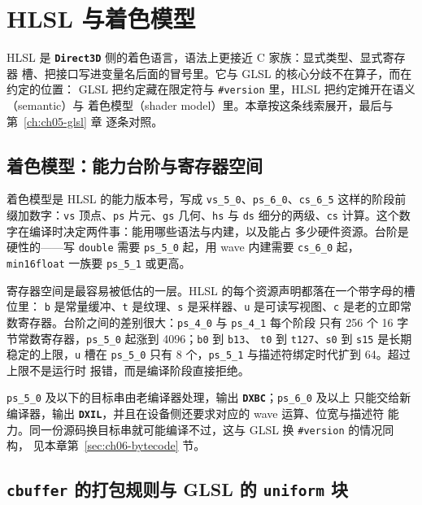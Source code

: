 \documentclass[12pt,a4paper,fontset=fandol]{ctexbook}
\newcommand{\Tp}[1]{\texttt{#1}}
\newcommand{\Lib}[1]{\textbf{\texttt{#1}}}
\newcommand{\Lang}[1]{\textsf{#1}}
\newcommand{\CL}{\Lang{C}}
\newcommand{\GSL}{\Lang{GLSL}}
\newcommand{\HSL}{\Lang{HLSL}}
\begin{document}
\chapter{HLSL 与着色模型}
\label{ch:ch06-hlsl}

\HSL{} 是 \Lib{Direct3D} 侧的着色语言，语法上更接近 \CL{} 家族：显式类型、显式寄存器
槽、把接口写进变量名后面的冒号里。它与 \GSL{} 的核心分歧不在算子，而在约定的位置：
\GSL{} 把约定藏在限定符与 \Tp{\#version} 里，\HSL{} 把约定摊开在语义（semantic）与
着色模型（shader model）里。本章按这条线索展开，最后与第~\ref{ch:ch05-glsl} 章
逐条对照。

\section{着色模型：能力台阶与寄存器空间}

着色模型是 \HSL{} 的能力版本号，写成 \Tp{vs\_5\_0}、\Tp{ps\_6\_0}、\Tp{cs\_6\_5}
这样的阶段前缀加数字：\Tp{vs} 顶点、\Tp{ps} 片元、\Tp{gs} 几何、\Tp{hs} 与 \Tp{ds}
细分的两级、\Tp{cs} 计算。这个数字在编译时决定两件事：能用哪些语法与内建，以及能占
多少硬件资源。台阶是硬性的——写 \Tp{double} 需要 \Tp{ps\_5\_0} 起，用 wave 内建需要
\Tp{cs\_6\_0} 起，\Tp{min16float} 一族要 \Tp{ps\_5\_1} 或更高。

寄存器空间是最容易被低估的一层。\HSL{} 的每个资源声明都落在一个带字母的槽位里：
\Tp{b} 是常量缓冲、\Tp{t} 是纹理、\Tp{s} 是采样器、\Tp{u} 是可读写视图、\Tp{c}
是老的立即常数寄存器。台阶之间的差别很大：\Tp{ps\_4\_0} 与 \Tp{ps\_4\_1} 每个阶段
只有 256 个 16 字节常数寄存器，\Tp{ps\_5\_0} 起涨到 4096；\Tp{b0} 到 \Tp{b13}、
\Tp{t0} 到 \Tp{t127}、\Tp{s0} 到 \Tp{s15} 是长期稳定的上限，\Tp{u} 槽在
\Tp{ps\_5\_0} 只有 8 个，\Tp{ps\_5\_1} 与描述符绑定时代扩到 64。超过上限不是运行时
报错，而是编译阶段直接拒绝。

\begin{note}[title={台阶同时决定工具与运行时}]
\Tp{ps\_5\_0} 及以下的目标串由老编译器处理，输出 \Lib{DXBC}；\Tp{ps\_6\_0} 及以上
只能交给新编译器，输出 \Lib{DXIL}，并且在设备侧还要求对应的 wave 运算、位宽与描述符
能力。同一份源码换目标串就可能编译不过，这与 \GSL{} 换 \Tp{\#version} 的情况同构，
见本章第~\ref{sec:ch06-bytecode} 节。
\end{note}

\section{\Tp{cbuffer} 的打包规则与 \GSL{} 的 \Tp{uniform} 块}
\end{document}
